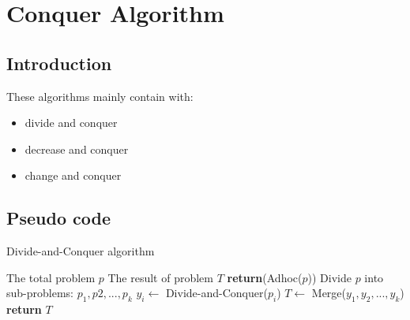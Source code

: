 \documentclass[cs4size, punct, nospace, fancyhdr, fntef]{ctexart}
\begin{document}
  \section{Conquer Algorithm}

  \subsection{Introduction}
    These algorithms mainly contain with:
    \begin{itemize}
      \item divide and conquer
      \item decrease and conquer
      \item change and conquer
    \end{itemize}
  \subsection{Pseudo code}
    \begin{algorithm}
    \caption{Divide-and-Conquer algorithm}\label{dnc}
    \begin{algorithmic}[1] %
    \Require The total problem $p$
    \Ensure The result of problem $T$
        \State \textbf{return}(Adhoc($p$))
      \EndIf
      \State Divide $p$ into sub-problems: ${p_1, p2, ..., p_k}$
        \State $y_i\gets$ Divide-and-Conquer($p_i$)
      \EndFor
      \State $T\gets$ Merge($y_1, y_2, ..., y_k$)
      \State \textbf{return} $T$
    \EndFunction
    \end{algorithmic}
    \end{algorithm}
\end{document}
